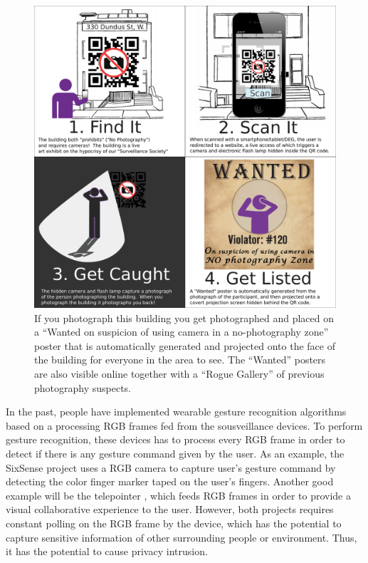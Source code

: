\begin{figure}
  \centering
  \includegraphics[width=6.0in]{ch5/figs/signo330infographics_small.pdf}
  \caption{If you photograph this building you get photographed and placed on
           a ``Wanted on suspicion of using camera in a no-photography zone''
           poster that is automatically generated and projected onto the face
           of the building for everyone in the area to see.  The
           ``Wanted'' posters are also visible online together with
           a ``Rogue Gallery'' of previous photography suspects.}
  \label{infographic}
\end{figure}

In the past, people have implemented wearable gesture recognition algorithms based on a processing RGB frames fed from the sousveillance devices. To perform gesture recognition, these devices has to process every RGB frame in order to detect if there is any gesture command given by the user. As an example, the SixSense project uses a RGB camera to capture user's gesture command by detecting the color finger marker taped on the user's fingers. Another good example will be the telepointer \cite{mann2000telepointer}, which feeds RGB frames in order to provide a visual collaborative experience to the user. However, both projects requires constant polling on the RGB frame by the device, which has the potential to capture sensitive information of other surrounding people or environment. Thus, it has the potential to cause privacy intrusion. 

